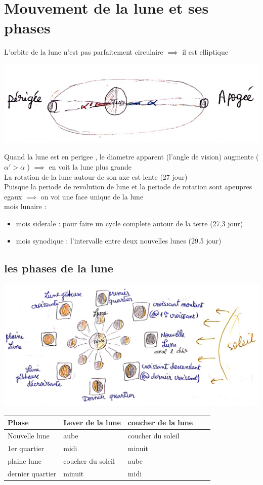 \documentclass[12pt]{book}
\begin{document}
    \chapter{Mouvement de la lune et ses phases}
        L'orbite de la lune n'est pas parfaitement circulaire $ \implies $ il est elliptique
        \begin{center}
            \includegraphics[width=0.5\linewidth]{pic/mouvementlune.png}
        \end{center}
        Quand la lune est en perigee , le diametre apparent (l'angle de vision) augmente ($ \alpha' > \alpha $ ) $ \implies $ en voit la lune plus grande \\
        La rotation de la lune autour de son axe est lente (27 jour) \\
        Puisque la periode de revolution de lune et la periode de rotation sont apeupres egaux $ \implies $ on voi une face unique de la lune \\
        mois lunaire :
        \begin{itemize}
            \item mois siderale : pour faire un cycle complete autour de la terre (27,3 jour)
            \item mois synodique : l'intervalle entre deux nouvelles lunes (29.5 jour)
        \end{itemize} 
        \section{les phases de la lune}
            \begin{center}
                \includegraphics[width=0.7\linewidth]{pic/lunephase.png}
                    \begin{tabular}{|l|l|l|l|l|}
                    \hline
                     Phase &  Lever de la lune & coucher de la lune    \\ \hline
                     Nouvelle lune& aube  &   coucher du soleil \\ \hline
                     1er quartier& midi &    minuit\\ \hline
                     plaine lune& coucher du soleil & aube    \\ \hline
                     dernier quartier&  minuit& midi    \\ \hline
                    \end{tabular}
            \end{center}
\end{document}
